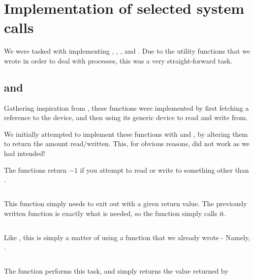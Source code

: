 \section{Implementation of selected system calls}
We were tasked with implementing ,
, , 
and . Due to the utility functions that we
wrote in order to deal with processes, this was a very straight-forward
task.

\subsection{ and }
Gathering inspiration from , these functions
were implemented by first fetching a reference to the
 device, and then using its
generic device to read and write from.

We initially attempted to implement these functions with
 and , by altering them to return
the amount read/written. This, for obvious reasons, did not work
as we had intended!

The functions return $-1$ if you attempt to read or write to something
other than  \\ .

\subsection{}
This function simply needs to exit out with a given return value. The
previously written  function is exactly what is
needed, so the function simply calls it.

\subsection{}
Like , this is simply a matter of using a function
that we already wrote - Namely, .

\subsection{}
The  function performs this task, and
 simply returns the value returned by 
